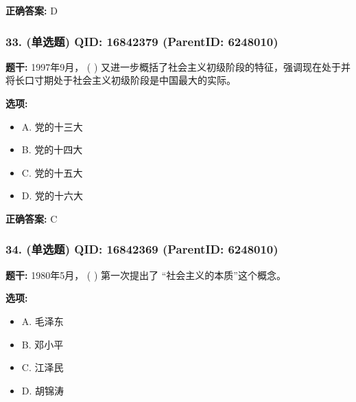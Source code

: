 \documentclass[12pt,UTF8]{ctexart}
\begin{document}
\textbf{正确答案:}
D

\vspace{0.3em}\hrulefill\vspace{0.7em}

\subsubsection*{33. (单选题) \small QID: 16842379 (ParentID: 6248010)}

\textbf{题干:}
1997年9月， ( ) 又进一步概括了社会主义初级阶段的特征，强调现在处于并将长口寸期处于社会主义初级阶段是中国最大的实际。



\textbf{选项:}
\begin{itemize}[leftmargin=*]

  \item A. 党的十三大

  \item B. 党的十四大

  \item C. 党的十五大

  \item D. 党的十六大

\end{itemize}

\textbf{正确答案:}
C

\vspace{0.3em}\hrulefill\vspace{0.7em}

\subsubsection*{34. (单选题) \small QID: 16842369 (ParentID: 6248010)}

\textbf{题干:}
1980年5月， ( ) 第一次提出了 “社会主义的本质”这个概念。



\textbf{选项:}
\begin{itemize}[leftmargin=*]

  \item A. 毛泽东

  \item B. 邓小平

  \item C. 江泽民

  \item D. 胡锦涛

\end{itemize}
\end{document}

